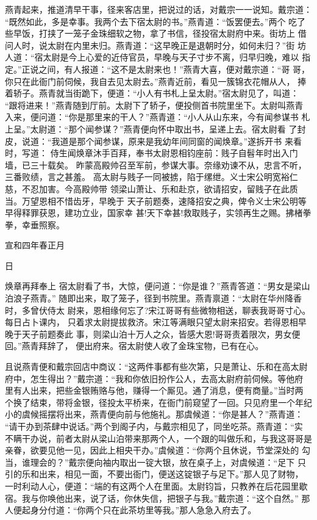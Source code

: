 燕青起来，推道清早干事，径来客店里，把说过的话，对戴宗一一说知。戴宗道：
“既然如此，多是幸事。我两个去下宿太尉的书。”燕青道：“饭罢便去。”两个
吃了些早饭，打挟了一笼子金珠细软之物，拿了书信，径投宿太尉府中来。街坊上
借问人时，说太尉在内里未归。燕青道：“这早晚正是退朝时分，如何未归？”街
坊人道：“宿太尉是今上心爱的近侍官员，早晚与天子寸步不离，归早归晚，难以
指定。”正说之间，有人报道：“这不是太尉来也！”燕青大喜，便对戴宗道：“哥
哥，你只在此衙门前伺候，我自去见太尉去。”燕青近前，看见一簇锦衣花帽从人，
捧着轿子。燕青就当街跪下，便道：“小人有书札上呈太尉。”宿太尉见了，叫道：
“跟将进来！”燕青随到厅前。太尉下了轿子，便投侧首书院里坐下。太尉叫燕青
入来，便问道：“你是那里来的干人？”燕青道：“小人从山东来，今有闻参谋书
札上呈。”太尉道：“那个闻参谋？”燕青便向怀中取出书，呈递上去。宿太尉看
了封皮，说道：“我道是那个闻参谋，原来是我幼年间同窗的闻焕章。”遂拆开书
来看时，写道：
侍生闻焕章沐手百拜，奉书太尉恩相钧座前：贱子自髫年时出入门墙，已三十载矣。
昨蒙高殿帅召至军前，参谋大事。奈缘劝谏不从，忠言不听，三番败绩，言之甚羞。
高太尉与贱子一同被掳，陷于缧绁。义士宋公明宽裕仁慈，不忍加害。今高殿帅带
领梁山萧让、乐和赴京，欲请招安，留贱子在此质当。万望恩相不惜齿牙，早晚于
天子前题奏，速降招安之典，俾令义士宋公明等早得释罪获恩，建功立业，国家幸
甚!天下幸甚!救取贱子，实领再生之赐。拂楮拳拳，幸垂照察。

宣和四年春正月

日

焕章再拜奉上
宿太尉看了书，大惊，便问道：“你是谁？”燕青答道：“男女是梁山泊浪子燕青。”
随即出来，取了笼子，径到书院里。燕青禀道：“太尉在华州降香时，多曾伏侍太
尉来，恩相缘何忘了?宋江哥哥有些微物相送，聊表我哥哥寸心。每日占卜课内，
只着求太尉提拔救济。宋江等满眼只望太尉来招安。若得恩相早晚于天子前题奏此
事，则梁山泊十万人之众，皆感大恩!哥哥责着限次，男女便回。”燕青拜辞了，
便出府来。宿太尉使人收了金珠宝物，已有在心。

且说燕青便和戴宗回店中商议：“这两件事都有些次第，只是萧让、乐和在高太尉
府中，怎生得出？”戴宗道：“我和你依旧扮作公人，去高太尉府前伺候。等他府
里有人出来，把些金银贿赂与他，赚得一个厮见。通了消息，便有商量。”当时两
个换了结束，带将金银，径投太平桥来，在衙门前窥望了一回。只见府里一个年纪
小的虞候摇摆将出来，燕青便向前与他施礼。那虞候道：“你是甚人？”燕青道：
“请干办到茶肆中说话。”两个到阁子内，与戴宗相见了，同坐吃茶。燕青道：“实
不瞒干办说，前者太尉从梁山泊带来那两个人，一个跟的叫做乐和，与我这哥哥是
亲眷，欲要见他一见，因此上相央干办。”虞候道：“你两个且休说，节堂深处的
勾当，谁理会的？”戴宗便向袖内取出一锭大银，放在桌子上，对虞候道：“足下
只引的乐和出来，相见一面，不要出衙门，便送这锭银子与足下。”那人见了财物，
一时利动人心，便道：“端的有这两个人在里面。太尉钧旨，只教养在后花园里歇
宿。我与你唤他出来，说了话，你休失信，把银子与我。”戴宗道：“这个自然。”
那人便起身分付道：“你两个只在此茶坊里等我。”那人急急入府去了。

